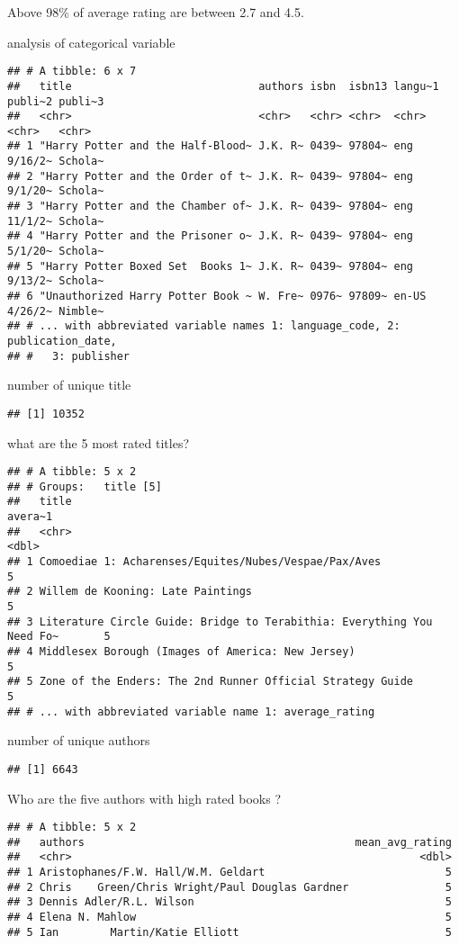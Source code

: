 \documentclass[
]{article}
\begin{document}
Above 98\% of average rating are between 2.7 and 4.5.

analysis of categorical variable

\begin{verbatim}
## # A tibble: 6 x 7
##   title                             authors isbn  isbn13 langu~1 publi~2 publi~3
##   <chr>                             <chr>   <chr> <chr>  <chr>   <chr>   <chr>  
## 1 "Harry Potter and the Half-Blood~ J.K. R~ 0439~ 97804~ eng     9/16/2~ Schola~
## 2 "Harry Potter and the Order of t~ J.K. R~ 0439~ 97804~ eng     9/1/20~ Schola~
## 3 "Harry Potter and the Chamber of~ J.K. R~ 0439~ 97804~ eng     11/1/2~ Schola~
## 4 "Harry Potter and the Prisoner o~ J.K. R~ 0439~ 97804~ eng     5/1/20~ Schola~
## 5 "Harry Potter Boxed Set  Books 1~ J.K. R~ 0439~ 97804~ eng     9/13/2~ Schola~
## 6 "Unauthorized Harry Potter Book ~ W. Fre~ 0976~ 97809~ en-US   4/26/2~ Nimble~
## # ... with abbreviated variable names 1: language_code, 2: publication_date,
## #   3: publisher
\end{verbatim}

number of unique title

\begin{verbatim}
## [1] 10352
\end{verbatim}

what are the 5 most rated titles?

\begin{verbatim}
## # A tibble: 5 x 2
## # Groups:   title [5]
##   title                                                                  avera~1
##   <chr>                                                                    <dbl>
## 1 Comoediae 1: Acharenses/Equites/Nubes/Vespae/Pax/Aves                        5
## 2 Willem de Kooning: Late Paintings                                            5
## 3 Literature Circle Guide: Bridge to Terabithia: Everything You Need Fo~       5
## 4 Middlesex Borough (Images of America: New Jersey)                            5
## 5 Zone of the Enders: The 2nd Runner Official Strategy Guide                   5
## # ... with abbreviated variable name 1: average_rating
\end{verbatim}

number of unique authors

\begin{verbatim}
## [1] 6643
\end{verbatim}

Who are the five authors with high rated books ?

\begin{verbatim}
## # A tibble: 5 x 2
##   authors                                          mean_avg_rating
##   <chr>                                                      <dbl>
## 1 Aristophanes/F.W. Hall/W.M. Geldart                            5
## 2 Chris    Green/Chris Wright/Paul Douglas Gardner               5
## 3 Dennis Adler/R.L. Wilson                                       5
## 4 Elena N. Mahlow                                                5
## 5 Ian        Martin/Katie Elliott                                5
\end{verbatim}
\end{document}
